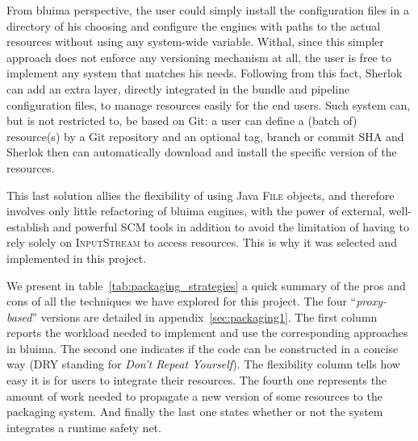 \documentclass{article}
\newcommand{\ID}[1]{{\textsc{#1}}}
\begin{document}
From bluima perspective, the user could simply install the configuration files in a directory of his
choosing and configure the engines with paths to the actual resources without using any system-wide
variable. Withal, since this simpler approach does not enforce any versioning mechanism at all, the
user is free to implement any system that matches his needs. Following from this fact, Sherlok can
add an extra layer, directly integrated in the bundle and pipeline configuration files, to manage
resources easily for the end users. Such system can, but is not restricted to, be based on Git: a
user can define a (batch of) resource(s) by a Git repository and an optional tag, branch or commit
SHA and Sherlok then can automatically download and install the specific version of the resources.

This last solution allies the flexibility of using Java \ID{File} objects, and therefore involves
only little refactoring of bluima engines, with the power of external, well-establish and powerful
SCM tools in addition to avoid the limitation of having to rely solely on \ID{InputStream} to access
resources. This is why it was selected and implemented in this project.

We present in table~\ref{tab:packaging_strategies} a quick summary of the pros and cons of all the
techniques we have explored for this project. The four ``\emph{proxy-based}'' versions are detailed
in appendix~\ref{sec:packaging1}. The first column reports the workload needed to implement and use
the corresponding approaches in bluima. The second one indicates if the code can be constructed in a
concise way (DRY standing for \emph{Don't Repeat Yourself}). The flexibility column tells how easy
it is for users to integrate their resources. The fourth one represents the amount of work needed to
propagate a new version of some resources to the packaging system. And finally the last one states
whether or not the system integrates a runtime safety net.
\end{document}
